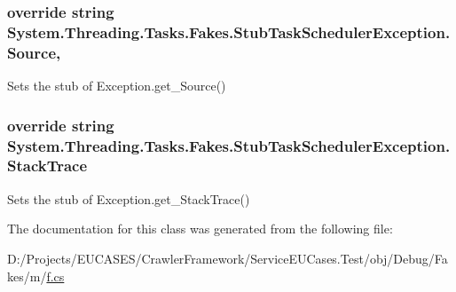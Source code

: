 \hypertarget{class_system_1_1_threading_1_1_tasks_1_1_fakes_1_1_stub_task_scheduler_exception_a72d0bd7d85b051df2cfc260335d3890d}{
\subsubsection[{Source}]{\setlength{\rightskip}{0pt plus 5cm}override string System.\-Threading.\-Tasks.\-Fakes.\-Stub\-Task\-Scheduler\-Exception.\-Source\hspace{0.3cm}{\ttfamily [get]}, {\ttfamily [set]}}}\label{class_system_1_1_threading_1_1_tasks_1_1_fakes_1_1_stub_task_scheduler_exception_a72d0bd7d85b051df2cfc260335d3890d}


Sets the stub of Exception.\-get\-\_\-\-Source()

\hypertarget{class_system_1_1_threading_1_1_tasks_1_1_fakes_1_1_stub_task_scheduler_exception_a0d152ab6fc1eaab0b8f5456570b5de67}{
\subsubsection[{Stack\-Trace}]{\setlength{\rightskip}{0pt plus 5cm}override string System.\-Threading.\-Tasks.\-Fakes.\-Stub\-Task\-Scheduler\-Exception.\-Stack\-Trace\hspace{0.3cm}{\ttfamily [get]}}}\label{class_system_1_1_threading_1_1_tasks_1_1_fakes_1_1_stub_task_scheduler_exception_a0d152ab6fc1eaab0b8f5456570b5de67}


Sets the stub of Exception.\-get\-\_\-\-Stack\-Trace()



The documentation for this class was generated from the following file\-:\begin{DoxyCompactItemize}
\item 
D\-:/\-Projects/\-E\-U\-C\-A\-S\-E\-S/\-Crawler\-Framework/\-Service\-E\-U\-Cases.\-Test/obj/\-Debug/\-Fakes/m/\hyperlink{m_2f_8cs}{f.\-cs}\end{DoxyCompactItemize}
